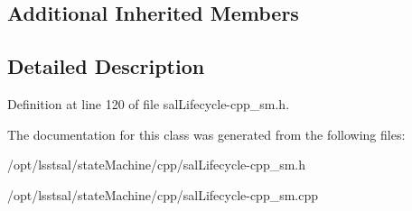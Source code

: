 \subsection*{Additional Inherited Members}


\subsection{Detailed Description}


Definition at line 120 of file sal\-Lifecycle-\/cpp\-\_\-sm.\-h.



The documentation for this class was generated from the following files\-:\begin{DoxyCompactItemize}
\item 
/opt/lsstsal/state\-Machine/cpp/sal\-Lifecycle-\/cpp\-\_\-sm.\-h\item 
/opt/lsstsal/state\-Machine/cpp/sal\-Lifecycle-\/cpp\-\_\-sm.\-cpp\end{DoxyCompactItemize}
